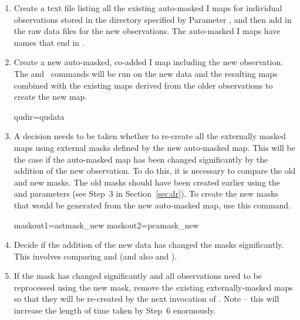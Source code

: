 \begin{enumerate}

\item Create a text file listing all the existing auto-masked I maps
  for individual observations stored in the directory specified by
  Parameter , and then add in the raw data files for the new
  observations. The auto-masked I maps have names that end in
  .

\begin{terminalv}
\end{terminalv}


\item Create a new auto-masked, co-added I map including the new
  observation. The  and \makemap\ commands
  will be run on the new
  data and the resulting maps combined with the existing maps derived
  from the older observations to create the new map.

\begin{terminalv}
     qudir=qudata
\end{terminalv}


\item A decision needs to be taken whether to re-create all the
  externally masked maps using external masks defined by the new
  auto-masked map. This will be the case if the auto-masked map has
  been changed significantly by the addition of the new
  observation. To do this, it is necessary to compare the old and new
  masks. The old masks should have been created earlier using the
   and  parameters (see Step~3 in Section~\ref{sec:dr}). To
  create the new masks that would be generated from the new
  auto-masked map, use this command.

\begin{terminalv}
     maskout1=astmask_new  maskout2=pcamask_new
\end{terminalv}

\item Decide if the addition of the new data has changed the masks
  significantly. This involves comparing  and
   (and also  and
  ).


\item If the mask has changed significantly and all observations need
  to be reprocessed using the new mask, remove the existing
  externally-masked maps so that they will be re-created by the next
  invocation of .  Note -- this will increase the length of time
  taken by Step~6 enormously.


\end{enumerate}
